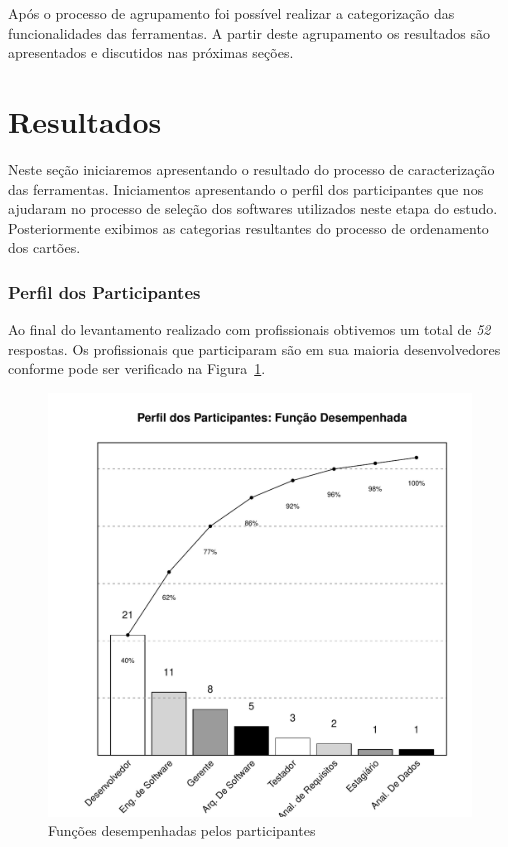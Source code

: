 Após o processo de agrupamento foi possível realizar a categorização das
funcionalidades das ferramentas. A partir deste agrupamento os resultados são
apresentados e discutidos nas próximas seções. 

\section{Resultados}
\label{sec:resultados}
Neste seção iniciaremos apresentando o resultado do processo de caracterização das
ferramentas. Iniciamentos apresentando o perfil dos participantes que nos
ajudaram no processo de seleção dos softwares utilizados neste etapa do estudo.
Posteriormente exibimos as categorias resultantes do processo de ordenamento dos
cartões.

\subsubsection{Perfil dos Participantes}
\label{ssub:Perfil dos Participantes}
Ao final do levantamento realizado com profissionais obtivemos um total de
\textit{52} respostas. Os profissionais que participaram são em sua maioria
desenvolvedores conforme pode ser verificado na
Figura~\ref{fig:grafico_escolha_ferramentas_funcao_participantes}. 

\begin{figure}[htpb]
	\centering
	\includegraphics[width=0.8\linewidth]{./chapter-caracterizacao-ferramentas/img/grafico_escolha_ferramentas_funcao_participantes.pdf}
	\caption{Funções desempenhadas pelos participantes}
	\label{fig:grafico_escolha_ferramentas_funcao_participantes}
\end{figure}

